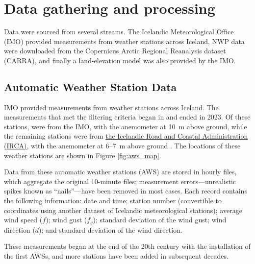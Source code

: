 
\chapter{Data gathering and processing}
\label{Chapter2}
Data were sourced from several streams. The Icelandic Meteorological Office (IMO) provided measurements from weather stations across Iceland, NWP data were downloaded from the Copernicus Arctic Regional Reanalysis dataset (CARRA), and finally a land-elevation model was also provided by the IMO.

\section{Automatic Weather Station Data}

IMO provided measurements from \nStationsMin weather stations across Iceland. The measurements that met the filtering criteria began in \startDateVedur and ended in 2023. Of these \nStationsMin stations, \nVedurMin were from the IMO, with the anemometer at 10~m above ground, while the remaining \nVGMin stations were from \href{https://www.vegagerdin.is/}{the Icelandic Road and Coastal Administration (IRCA)}, with the anemometer at 6–7~m above ground \cite{vegagerdin_postur}. The locations of these weather stations are shown in Figure \ref{fig:aws_map}.

Data from these automatic weather stations (AWS) are stored in hourly files, which aggregate the original 10-minute files; measurement errors—unrealistic spikes known as “nails”—have been removed in most cases. Each record contains the following information: date and time; station number (convertible to coordinates using another dataset of Icelandic meteorological stations); average wind speed (\(f\)); wind gust (\(f_g\)); standard deviation of the wind gust; wind direction (\(d\)); and standard deviation of the wind direction.

These measurements began at the end of the 20th century with the installation of the first AWSs, and more stations have been added in subsequent decades.


